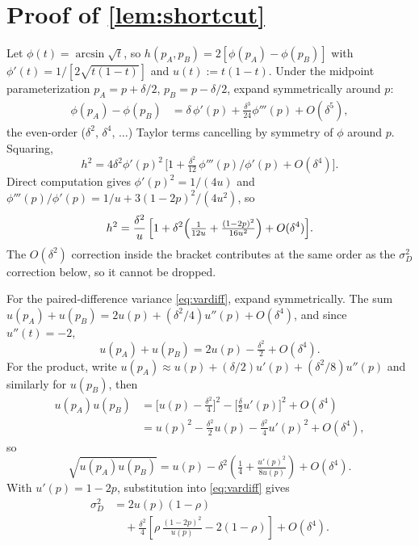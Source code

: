 \documentclass{article}
\theoremstyle{plain}
\theoremstyle{definition}
\begin{document}
\section{Proof of \cref{lem:shortcut}}
\label{app:proof}

Let $\phi(t)=\arcsin\sqrt{t}$, so $h(p_A,p_B)=2[\phi(p_A)-\phi(p_B)]$ with $\phi'(t)=1/[2\sqrt{t(1{-}t)}]$ and $u(t):=t(1{-}t)$. Under the midpoint parameterization $p_A = p + \delta/2$, $p_B = p - \delta/2$, expand symmetrically around $p$:
\begin{align}
\phi(p_A) - \phi(p_B) &= \delta\,\phi'(p) + \frac{\delta^3}{24}\phi'''(p) + O(\delta^5),
\end{align}
the even-order ($\delta^2$, $\delta^4$, $\ldots$) Taylor terms cancelling by symmetry of $\phi$ around $p$. Squaring,
\begin{equation}
h^2 = 4\delta^2 \phi'(p)^2\,\bigl[1 + \tfrac{\delta^2}{12}\,\phi'''(p)/\phi'(p) + O(\delta^4)\bigr].
\end{equation}
Direct computation gives $\phi'(p)^2 = 1/(4u)$ and $\phi'''(p)/\phi'(p) = 1/u + 3(1{-}2p)^2/(4u^2)$, so
\begin{equation}
\label{eq:h2-expansion}
h^2 = \frac{\delta^2}{u}\,\Bigl[1 + \delta^2\!\left(\tfrac{1}{12u} + \tfrac{(1{-}2p)^2}{16u^2}\right) + O(\delta^4)\Bigr].
\end{equation}
The $O(\delta^2)$ correction inside the bracket contributes at the same order as the $\sigma_D^2$ correction below, so it cannot be dropped.

For the paired-difference variance \cref{eq:vardiff}, expand symmetrically. The sum $u(p_A)+u(p_B) = 2u(p) + (\delta^2/4)u''(p) + O(\delta^4)$, and since $u''(t)=-2$,
\begin{equation}
u(p_A)+u(p_B) = 2u(p) - \tfrac{\delta^2}{2} + O(\delta^4).
\end{equation}
For the product, write $u(p_A) \approx u(p) + (\delta/2)u'(p) + (\delta^2/8)u''(p)$ and similarly for $u(p_B)$, then
\begin{align}
u(p_A)u(p_B) &= \!\bigl[u(p) - \tfrac{\delta^2}{4}\bigr]^2 - \!\bigl[\tfrac{\delta}{2}u'(p)\bigr]^2 + O(\delta^4) \nonumber\\
&= u(p)^2 - \tfrac{\delta^2}{2}u(p) - \tfrac{\delta^2}{4}u'(p)^2 + O(\delta^4),
\end{align}
so
\begin{equation}
\sqrt{u(p_A)u(p_B)} = u(p) - \delta^2\!\left(\tfrac{1}{4} + \tfrac{u'(p)^2}{8u(p)}\right) + O(\delta^4).
\end{equation}
With $u'(p)=1{-}2p$, substitution into \cref{eq:vardiff} gives
\begin{align}
\sigma_D^2 &= 2u(p)(1{-}\rho) \nonumber\\
&\quad + \tfrac{\delta^2}{4}\!\left[\rho\,\tfrac{(1{-}2p)^2}{u(p)} - 2(1{-}\rho)\right] + O(\delta^4).
\end{align}
\end{document}
